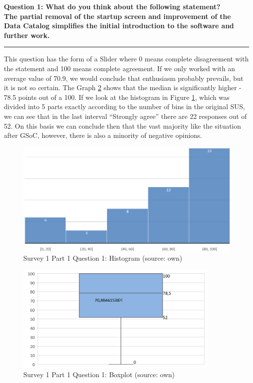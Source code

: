 \documentclass[a4paper,10pt,twoside]{article}
\begin{document}
\newpage
\noindent \textbf{Question 1: What do you think about the following statement? \\
The partial removal of the startup screen and improvement of the Data Catalog simplifies the initial introduction to the software and further work.}
\par\noindent\rule{\textwidth}{0.4pt}
\noindent This question has the form of a Slider where 0 means complete disagreement with the statement and 100 means complete agreement. If we only worked with an average value of 70.9, we would conclude that enthusiasm probably prevails, but it is not so certain. The Graph \ref{fig:survey1_part1_question1_boxplot} shows that the median is significantly higher - 78.5 points out of a 100. If we look at the histogram in Figure \ref{fig:survey1_part1_question1_histogram}, which was divided into 5 parts exactly according to the number of bins in the original SUS, we can see that in the last interval ``Strongly agree'' there are 22 responses out of 52. On this basis we can conclude then that the vast majority like the situation after GSoC, however, there is also a minority of negative opinions.

\begin{figure}[hbt!] 
\begin{center}
\includegraphics[width=12cm]{../surveys/analyzed_data/survey1_part1_question1_excel_histogram.png} 
\caption[Survey 1 Part 1 Question 1: Histogram]{Survey 1 Part 1 Question 1: Histogram (source: own)}
\label{fig:survey1_part1_question1_histogram}
\end{center}
\end{figure}

\vspace{0.3cm}
\begin{figure}[hbt!] 
\begin{center}
\includegraphics[width=10cm]{../surveys/analyzed_data/survey1_part1_question1_excel_boxplot.png} 
\caption[Survey 1 Part 1 Question 1: Boxplot]{Survey 1 Part 1 Question 1: Boxplot (source: own)}
\label{fig:survey1_part1_question1_boxplot}
\end{center}
\end{figure}
\end{document}
